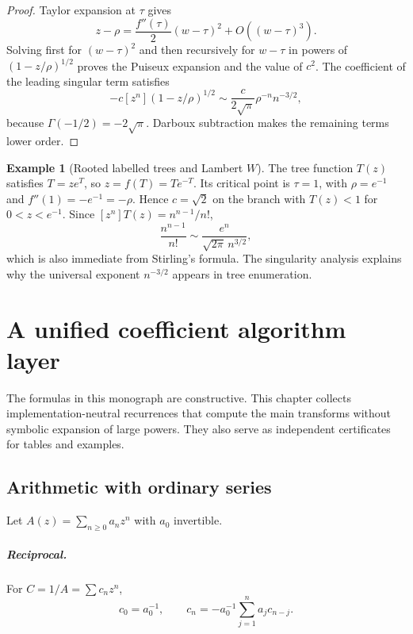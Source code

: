 \documentclass[11pt,a4paper,oneside,openany]{book}
\theoremstyle{definition}
\newtheorem{example}[theorem]{Example}
\theoremstyle{remark}
\begin{document}
\begin{proof}
Taylor expansion at $\tau$ gives
\[
 z-\rho=\frac{f''(\tau)}2(w-\tau)^2+O((w-\tau)^3).
\]
Solving first for $(w-\tau)^2$ and then recursively for $w-\tau$ in powers of
$(1-z/\rho)^{1/2}$ proves the Puiseux expansion and the value of $c^2$.  The
coefficient of the leading singular term satisfies
\[
 -c[z^n](1-z/\rho)^{1/2}
 \sim\frac{c}{2\sqrt\pi}\rho^{-n}n^{-3/2},
\]
because $\Gamma(-1/2)=-2\sqrt\pi$.  Darboux subtraction makes the remaining
terms lower order.
\end{proof}

\begin{example}[Rooted labelled trees and Lambert $W$]
The tree function $T(z)$ satisfies $T=ze^T$, so $z=f(T)=Te^{-T}$.  Its critical
point is $\tau=1$, with $\rho=e^{-1}$ and $f''(1)=-e^{-1}=-\rho$.  Hence
$c=\sqrt2$ on the branch with $T(z)<1$ for $0<z<e^{-1}$.  Since
$[z^n]T(z)=n^{n-1}/n!$,
\[
 \frac{n^{n-1}}{n!}
 \sim\frac{e^n}{\sqrt{2\pi}\,n^{3/2}},
\]
which is also immediate from Stirling's formula.  The singularity analysis
explains why the universal exponent $n^{-3/2}$ appears in tree enumeration.
\end{example}

\chapter{A unified coefficient algorithm layer}
\label{ch:algorithm-layer-new}

The formulas in this monograph are constructive.  This chapter collects
implementation-neutral recurrences that compute the main transforms without
symbolic expansion of large powers.  They also serve as independent
certificates for tables and examples.

\section{Arithmetic with ordinary series}

Let $A(z)=\sum_{n\ge0}a_nz^n$ with $a_0$ invertible.

\paragraph{Reciprocal.}
For $C=1/A=\sum c_nz^n$,
\begin{equation}
 c_0=a_0^{-1},\qquad
 c_n=-a_0^{-1}\sum_{j=1}^na_jc_{n-j}.
 \label{new:eq:series-reciprocal-algorithm}
\end{equation}
\end{document}
